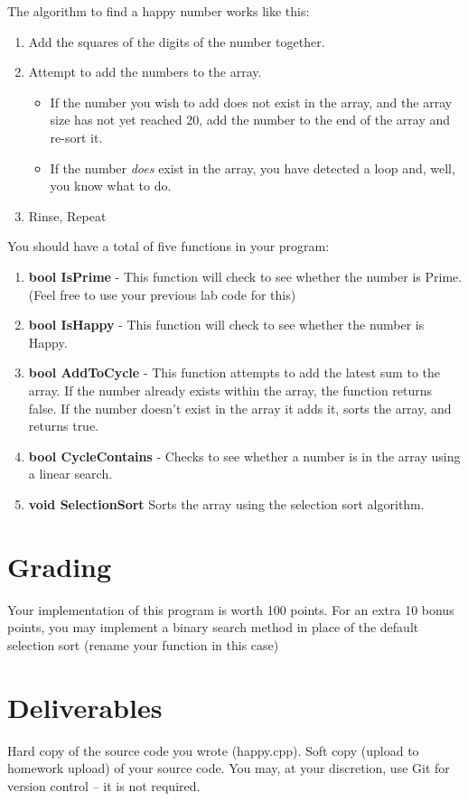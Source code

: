 \documentclass[letterpaper,12pt]{article}
\begin{document}
\begin{itemize}
The algorithm to find a happy number works like this:
\begin{enumerate}
    \item Add the squares of the digits of the number together.
    \item Attempt to add the numbers to the array.
        \begin{itemize}
            \item If the number you wish to add does not exist in the array, and the array size
                has not yet reached 20, add the number to the end of the array and re-sort it.
            \item If the number \emph{does} exist in the array, you have detected a loop and, well,
                you know what to do.
        \end{itemize}
    \item Rinse, Repeat
\end{enumerate}

You should have a total of five functions in your program:
\begin{enumerate}
    \item \textbf{bool IsPrime} - This function will check to see whether the number is Prime. (Feel free to use your previous lab code for this)
    \item \textbf{bool IsHappy} - This function will check to see whether the number is Happy.
    \item \textbf{bool AddToCycle} - This function attempts to add the latest sum to the array.
       If the number already exists within the array, the function returns false.
       If the number doesn’t exist in the array it adds it, sorts the array, and returns true.
    \item \textbf{bool CycleContains} - Checks to see whether a number is in the array using a linear search.
    \item \textbf{void SelectionSort} Sorts the array using the selection sort algorithm.
\end{enumerate}

\section*{Grading}
Your implementation of this program is worth 100 points. For an extra 10 bonus points,
you may implement a binary search method in place of the default selection sort (rename your function in this case)


\section*{Deliverables}
Hard copy of the source code you wrote (happy.cpp). Soft copy (upload to homework upload) of
your source code. You may, at your discretion, use Git for version control -- it is not required.


\end{itemize}
\end{document}
